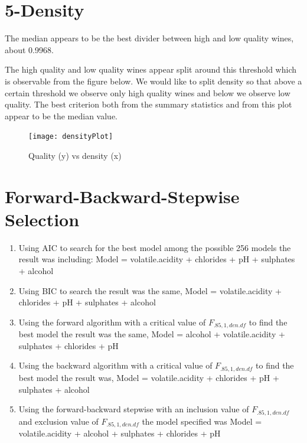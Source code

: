 \documentclass[]{article}
\begin{document}
\section*{5-Density}
The median appears to be the best divider between high and low quality wines, about 0.9968. 
\begin{table}[H]
	\centering
\caption{Summary statistics for density}
\end{table}
The high quality and low quality wines appear split around this threshold which is observable from the figure below. We would like to split density so that above a certain threshold we observe only high quality wines and below we observe low quality. The best criterion both from the summary statistics and from this plot appear to be the median value.
\begin{figure}[H]
	\centering
	\texttt{[image: densityPlot]}
	\caption{Quality (y) vs density (x)}
\end{figure}
	
	
\section*{Forward-Backward-Stepwise Selection}
\begin{enumerate}[label=\alph*)]
	\item Using AIC to search for the best model among the possible 256 models the result was including: Model = volatile.acidity + chlorides +  pH + sulphates + alcohol	
	\item Using BIC to search the result was the same, Model = volatile.acidity + chlorides + pH + sulphates +  alcohol
	\item Using the forward algorithm with a critical value of $ F_{.85, 1, den. df} $ to find the best model the result was the same, Model = alcohol + volatile.acidity + sulphates + chlorides + pH 
	\item Using the backward algorithm with a critical value of $ F_{.85, 1, den. df} $ to find the best model the result was, Model =  volatile.acidity + chlorides + pH + sulphates + alcohol
	\item Using the forward-backward stepwise with an inclusion value of $ F_{.85, 1, den. df} $ and exclusion value of $  F_{.85, 1, den. df} $ the model specified was Model =  volatile.acidity + alcohol + sulphates + chlorides + pH
\end{enumerate}
\end{document}
